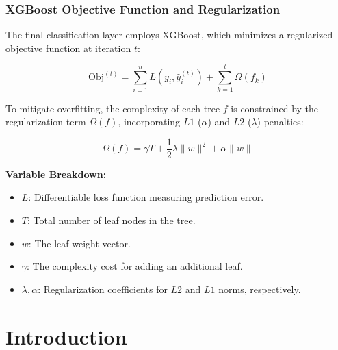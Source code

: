 \documentclass{article}
\begin{document}
\subsubsection{XGBoost Objective Function and Regularization}
The final classification layer employs XGBoost, which minimizes a regularized objective function at iteration $t$:

\begin{equation}
    \text{Obj}^{(t)} = \sum_{i=1}^{n} L(y_i, \hat{y}_i^{(t)}) + \sum_{k=1}^{t} \Omega(f_k)
\end{equation}

To mitigate overfitting, the complexity of each tree $f$ is constrained by the regularization term $\Omega(f)$, incorporating $L1$ ($\alpha$) and $L2$ ($\lambda$) penalties:

\begin{equation}
    \Omega(f) = \gamma T + \frac{1}{2} \lambda \|w\|^2 + \alpha \|w\|
\end{equation}

\textbf{Variable Breakdown:}
\begin{itemize}
    \item \textbf{$L$}: Differentiable loss function measuring prediction error.
    \item \textbf{$T$}: Total number of leaf nodes in the tree.
    \item \textbf{$w$}: The leaf weight vector.
    \item \textbf{$\gamma$}: The complexity cost for adding an additional leaf.
    \item \textbf{$\lambda, \alpha$}: Regularization coefficients for $L2$ and $L1$ norms, respectively.
\end{itemize}

\section{Introduction}
\end{document}
